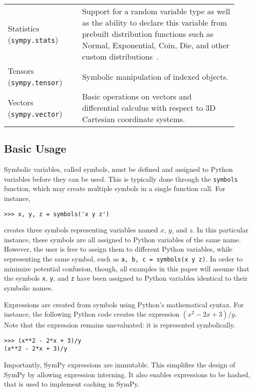 \begin{longtable}[htbc]{>{\raggedright}p{0.30\linewidth}p{0.63\linewidth}}
Statistics (\texttt{sympy.stats}) & Support for a random variable type as well as the ability to
declare this variable from prebuilt distribution functions such as
Normal, Exponential, Coin, Die, and other custom distributions~\cite{StatsMRocklin}.\\

Tensors (\texttt{sympy.tensor}) & Symbolic manipulation of indexed objects.\\

Vectors (\texttt{sympy.vector}) & Basic operations on vectors and differential calculus with respect
to 3D Cartesian coordinate systems.\\
\bottomrule

\end{longtable}

\subsection{Basic Usage}


Symbolic variables, called symbols, must be defined and assigned to
Python variables before they can be used. This is typically done through the
\texttt{symbols} function, which may create multiple symbols in a single
function call. For instance,
\begin{verbatim}
>>> x, y, z = symbols('x y z')
\end{verbatim}
creates three symbols representing variables named $x$, $y$, and $z$. In this
particular instance, these symbols are all assigned to Python variables of the
same name. However, the user is free to assign them to different
Python variables, while representing the same symbol, such as
\texttt{a, b, c = symbols(\textquotesingle{}x y z\textquotesingle{})}.
In order to minimize potential confusion, though, all examples in this paper will
assume that
the symbols \verb|x|, \verb|y|, and \verb|z| have been assigned to Python variables
identical to their symbolic names.

Expressions are created from symbols using Python's mathematical syntax.  For
instance, the following Python code creates the expression $(x^2 - 2x + 3)/y$.
Note that the expression remains unevaluated: it is represented symbolically.

\begin{verbatim}
>>> (x**2 - 2*x + 3)/y
(x**2 - 2*x + 3)/y
\end{verbatim}

Importantly, SymPy expressions are immutable. This simplifies the design of
SymPy by allowing expression interning. It also enables expressions to be
hashed, that is used to implement caching in SymPy.

